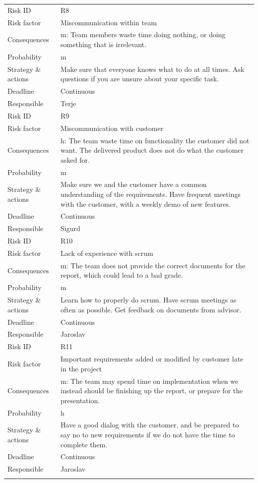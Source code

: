 \begin{longtable}{>{\footnotesize}p{} >{\footnotesize}p{}}
	\midrule
	Risk ID & R8 \\
	Risk factor & Miscommunication within team \\
	Consequences & \Gls{m}: Team members waste time doing nothing, or doing something that is irrelevant. \\
	Probability & \Gls{m} \\ 
	Strategy \& actions & Make sure that everyone knows what to do at all times. Ask questions if you are unsure about your specific task. \\
	Deadline & Continuous \\
	Responsible & Terje \\
	\midrule
	Risk ID & R9 \\
	Risk factor & Miscommunication with customer \\
	Consequences & \Gls{h}: The team waste time on functionality the customer did not want. The delivered product does not do what the customer asked for. \\
	Probability & \Gls{m} \\ 
	Strategy \& actions & Make sure we and the customer have a common understanding of the requirements. Have frequent meetings with the customer, with a weekly demo of new features.  \\
	Deadline & Continuous \\
	Responsible & Sigurd \\
	\midrule
	Risk ID & R10 \\
	Risk factor & Lack of experience with \Gls{scrum} \\
	Consequences & \Gls{m}: The team does not provide the correct documents for the report, which could lead to a bad grade. \\
	Probability & \Gls{m} \\ 
	Strategy \& actions & Learn how to properly do \Gls{scrum}. Have \Gls{scrum} meetings as often as possible. Get feedback on documents from advisor. \\
	Deadline & Continuous \\
	Responsible & Jaroslav \\
	\midrule
	Risk ID & R11 \\
	Risk factor & Important requirements added or modified by customer late in the project \\
	Consequences & \Gls{m}: The team may spend time on implementation when we instead should be finishing up the report, or prepare for the presentation. \\
	Probability & \Gls{h} \\ 
	Strategy \& actions &  Have a good dialog with the customer, and be prepared to say no to new requirements if we do not have the time to complete them.\\
	Deadline & Continuous \\
	Responsible & Jaroslav \\
	\bottomrule
	\label{tab:risk}
\end{longtable}
